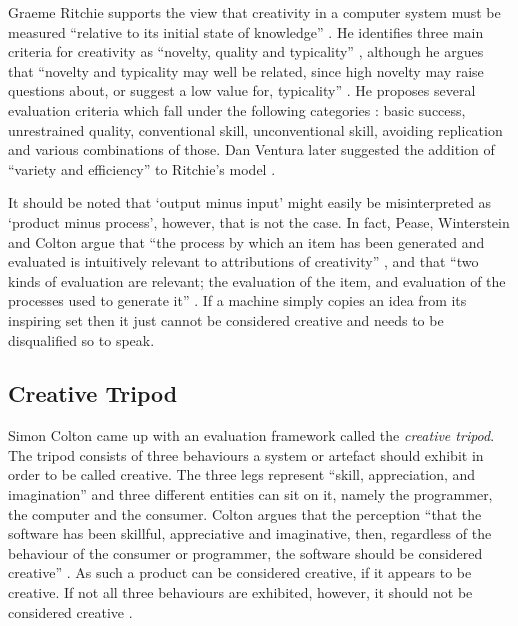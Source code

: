 Graeme Ritchie supports the view that creativity in a computer system must be measured ``relative to its initial state of knowledge'' \autocite*{Ritchie2007}. He identifies three main criteria for creativity as ``novelty, quality and typicality'' \autocite*{Ritchie2007}, although he argues that ``novelty and typicality may well be related, since high novelty may raise questions about, or suggest a low value for, typicality'' \autocite*{Ritchie2001,Ritchie2007}. He proposes several evaluation criteria which fall under the following categories \autocite*{Ritchie2007}: basic success, unrestrained quality, conventional skill, unconventional skill, avoiding replication and various combinations of those. Dan Ventura later suggested the addition of ``variety and efficiency'' to Ritchie's model \autocite*{Ventura2008}.

It should be noted that `output minus input' might easily be misinterpreted as `product minus process', however, that is not the case. In fact, Pease, Winterstein and Colton argue that ``the process by which an item has been generated and evaluated is intuitively relevant to attributions of creativity'' \autocite*{Pease2001}, and that ``two kinds of evaluation are relevant; the evaluation of the item, and evaluation of the processes used to generate it'' \autocite*{Pease2001}. If a machine simply copies an idea from its inspiring set then it just cannot be considered creative and needs to be disqualified so to speak.


\subsection{Creative Tripod}

Simon Colton came up with an evaluation framework called the \textit{creative tripod}. The tripod consists of three behaviours a system or artefact should exhibit in order to be called creative. The three legs represent ``skill, appreciation, and imagination'' and three different entities can sit on it, namely the programmer, the computer and the consumer. Colton argues that the perception ``that the software has been skillful, appreciative and imaginative, then, regardless of the behaviour of the consumer or programmer, the software should be considered creative'' \autocite*{Colton2008, Colton2008a}. As such a product can be considered creative, if it appears to be creative. If not all three behaviours are exhibited, however, it should not be considered creative \autocite{Colton2008, Colton2008a}.

